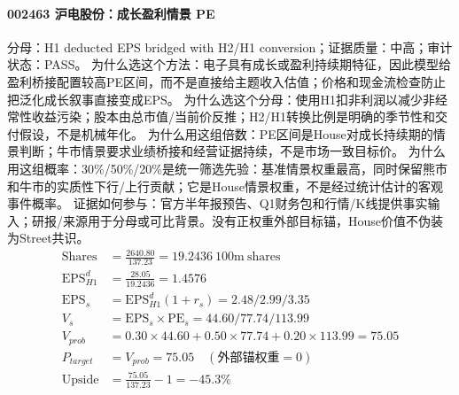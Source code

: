 \paragraph{002463 沪电股份：成长盈利情景 PE}
分母：H1 deducted EPS bridged with H2/H1 conversion；证据质量：中高；审计状态：PASS。
为什么选这个方法：电子具有成长或盈利持续期特征，因此模型给盈利桥接配置较高PE区间，而不是直接给主题收入估值；价格和现金流检查防止把泛化成长叙事直接变成EPS。
为什么选这个分母：使用H1扣非利润以减少非经常性收益污染；股本由总市值/当前价反推；H2/H1转换比例是明确的季节性和交付假设，不是机械年化。
为什么用这组倍数：PE区间是House对成长持续期的情景判断；牛市情景要求业绩桥接和经营证据持续，不是市场一致目标价。
为什么用这组概率：30\%/50\%/20\%是统一筛选先验：基准情景权重最高，同时保留熊市和牛市的实质性下行/上行贡献；它是House情景权重，不是经过统计估计的客观事件概率。
证据如何参与：官方半年报预告、Q1财务包和行情/K线提供事实输入；研报/来源用于分母或可比背景。没有正权重外部目标锚，House价值不伪装为Street共识。
\begin{align*}
\mathrm{Shares} &= \frac{2640.80}{137.23}=19.2436\ \mathrm{100m\ shares}\\
\mathrm{EPS}_{H1}^d &= \frac{28.05}{19.2436}=1.4576\\
\mathrm{EPS}_s &= \mathrm{EPS}_{H1}^d(1+r_s)=2.48/2.99/3.35\\
V_s &= \mathrm{EPS}_s\times \mathrm{PE}_s=44.60/77.74/113.99\\
V_{prob} &= 0.30\times 44.60+0.50\times 77.74+0.20\times 113.99=75.05\\
P_{target} &= V_{prob}=75.05\quad(\text{外部锚权重}=0)\\
\mathrm{Upside} &= \frac{75.05}{137.23}-1=-45.3\%\\
\end{align*}

